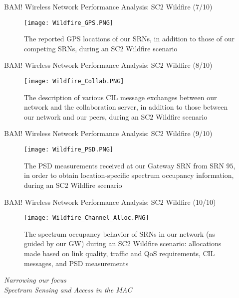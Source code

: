 \documentclass{beamer}
\begin{document}
\begin{frame}{BAM! Wireless Network Performance Analysis: SC$2$ Wildfire (7/10)}
\begin{figure}
    \centering
    \texttt{[image: Wildfire\_GPS.PNG]}
    \caption{The reported GPS locations of our SRNs, in addition to those of our competing SRNs, during an SC$2$ Wildfire scenario}
    \label{fig:25}
\end{figure}
\end{frame}
\begin{frame}{BAM! Wireless Network Performance Analysis: SC$2$ Wildfire (8/10)}
\begin{figure}
    \centering
    \texttt{[image: Wildfire\_Collab.PNG]}
    \caption{The description of various CIL message exchanges between our network and the collaboration server, in addition to those between our network and our peers, during an SC$2$ Wildfire scenario}
    \label{fig:26}
\end{figure}
\end{frame}
\begin{frame}{BAM! Wireless Network Performance Analysis: SC$2$ Wildfire (9/10)}
\begin{figure}
    \centering
    \texttt{[image: Wildfire\_PSD.PNG]}
    \caption{The PSD measurements received at our Gateway SRN from SRN $95$, in order to obtain location-specific spectrum occupancy information, during an SC$2$ Wildfire scenario}
    \label{fig:27}
\end{figure}
\end{frame}
\begin{frame}{BAM! Wireless Network Performance Analysis: SC$2$ Wildfire (10/10)}
\begin{figure}
    \centering
    \texttt{[image: Wildfire\_Channel\_Alloc.PNG]}
    \caption{The spectrum occupancy behavior of SRNs in our network (as guided by our GW) during an SC$2$ Wildfire scenario: allocations made based on link quality, traffic and QoS requirements, CIL messages, and PSD measurements}
    \label{fig:28}
\end{figure}
\end{frame}
\begin{frame}{}
  \centering \Huge
  \emph{Narrowing our focus\\
        \LARGE{Spectrum Sensing and Access in the MAC}}
\end{frame}
\end{document}
